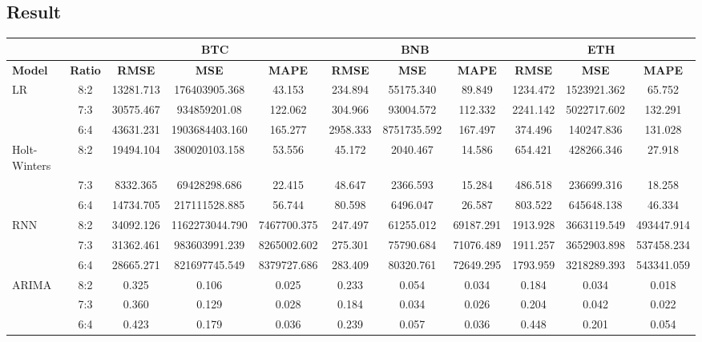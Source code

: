\documentclass[conference]{IEEEtran}
\begin{document}
\subsection{Result} 
\begin{table}[H]
\centering
\small
\setlength{\tabcolsep}{0.5pt} 
\begin{tabular}{|l|c||c||c||c||c||c||c||c||c||c|}
\hline
& & \multicolumn{3}{c|}{\textbf{BTC}} & \multicolumn{3}{c|}{\textbf{BNB}} & \multicolumn{3}{c|}{\textbf{ETH}} \\
\hline
\textbf{Model} & \textbf{Ratio} & \textbf{RMSE} & \textbf{MSE} & \textbf{MAPE} & \textbf{RMSE} & \textbf{MSE} & \textbf{MAPE} & \textbf{RMSE} & \textbf{MSE} & \textbf{MAPE} \\
\hline
LR   & 8:2 & 13281.713 & 176403905.368 & 43.153 & 234.894 & 55175.340 & 89.849 & 1234.472 &  1523921.362 & 65.752\\
    & 7:3 & 30575.467 & 934859201.08 & 122.062 & 304.966 & 93004.572 & 112.332 & 2241.142  & 5022717.602 & 132.291 \\
    & 6:4 & 43631.231 & 1903684403.160 & 165.277 & 2958.333 & 8751735.592 & 167.497 & 374.496 & 140247.836 & 131.028  \\
\hline
Holt-Winters & 8:2 & 19494.104 & 380020103.158 & 53.556 & 45.172 & 2040.467 & 14.586 & 654.421 & 428266.346 & 27.918 \\
    & 7:3 & 8332.365 & 69428298.686 & 22.415 & 48.647 & 2366.593 & 15.284 & 486.518 & 236699.316 & 18.258  \\
    & 6:4 & 14734.705 & 217111528.885 & 56.744 & 80.598 & 6496.047 & 26.587 & 803.522 & 645648.138 & 46.334 \\
\hline
RNN & 8:2 & 34092.126 & 1162273044.790 & 7467700.375 & 247.497 & 61255.012 & 69187.291 & 1913.928 & 3663119.549 & 493447.914 \\
    & 7:3 & 31362.461 & 983603991.239 & 8265002.602 & 275.301 & 75790.684 & 71076.489 & 1911.257 & 3652903.898 & 537458.234 \\
    & 6:4 & 28665.271 & 821697745.549 & 8379727.686 & 283.409 & 80320.761 & 72649.295 & 1793.959 & 3218289.393 & 543341.059 \\
\hline
ARIMA & 8:2 & 0.325 & 0.106 & 0.025 & 0.233 & 0.054 & 0.034 & 0.184 & 0.034 & 0.018 \\
    & 7:3 & 0.360 & 0.129 & 0.028 & 0.184 & 0.034 & 0.026 & 0.204 & 0.042 & 0.022 \\
    & 6:4 & 0.423 & 0.179 & 0.036 & 0.239 & 0.057 & 0.036 & 0.448 & 0.201 & 0.054 \\

\end{tabular}
\end{table}
\end{document}
